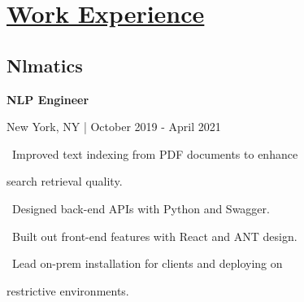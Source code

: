 \documentclass{article}
\begin{document}
\begin{minipage}[t]{0.45\textwidth\hspace{0in}}

    \section{\underline{Work Experience}}
        \vspace{-0.8em}
        \subsection{Nlmatics}
        \vspace{-0.5em}\hspace{0.1em}
        \mdseries\bfseries{NLP Engineer}
        \vspace{0.1em}
        
        \hspace{0.5em}\mdseries\textrm{New York, NY | October 2019 - April 2021}

        \vspace{-0.8em}
        \begin{minipage}[t]{3.75in\textwidth\hspace{0in}}
            \vspace{0.3em}
            \hspace{1em}\textasteriskcentered \, \mdseries\textrm{Improved text indexing from PDF documents to enhance}
            
            \hspace{1.6em} search retrieval quality.
            
            \vspace{0.3em}
            \hspace{1em}\textasteriskcentered \, \mdseries\textrm{Designed back-end APIs with Python and Swagger.}

            \vspace{0.3em}
            \hspace{1em}\textasteriskcentered \, \mdseries\textrm{Built out front-end features with React and ANT design.}
            
            \vspace{0.3em}
            \hspace{1em}\textasteriskcentered \, \mdseries\textrm{Lead on-prem installation for clients and deploying on}

            \hspace{1.6em} restrictive environments.
            

\end{minipage}
\end{minipage}
\end{document}

